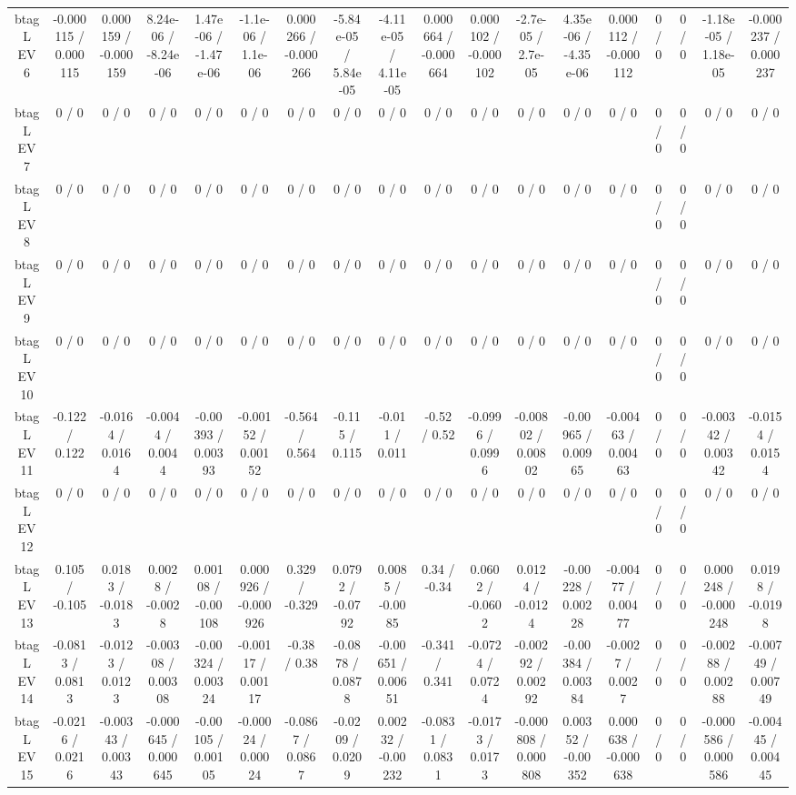 \documentclass[10pt]{article}
\begin{document}
\begin{table}[htbp]
\begin{center}
\begin{tabular}{|c|c|c|c|c|c|c|c|c|c|c|c|c|c|c|c|c|c|}
  btag L EV 6 & -0.000115 / 0.000115 & 0.000159 / -0.000159 & 8.24e-06 / -8.24e-06 & 1.47e-06 / -1.47e-06 & -1.1e-06 / 1.1e-06 & 0.000266 / -0.000266 & -5.84e-05 / 5.84e-05 & -4.11e-05 / 4.11e-05 & 0.000664 / -0.000664 & 0.000102 / -0.000102 & -2.7e-05 / 2.7e-05 & 4.35e-06 / -4.35e-06 & 0.000112 / -0.000112 & 0 / 0 & 0 / 0 & -1.18e-05 / 1.18e-05 & -0.000237 / 0.000237 \\ 
  btag L EV 7 & 0 / 0 & 0 / 0 & 0 / 0 & 0 / 0 & 0 / 0 & 0 / 0 & 0 / 0 & 0 / 0 & 0 / 0 & 0 / 0 & 0 / 0 & 0 / 0 & 0 / 0 & 0 / 0 & 0 / 0 & 0 / 0 & 0 / 0 \\ 
  btag L EV 8 & 0 / 0 & 0 / 0 & 0 / 0 & 0 / 0 & 0 / 0 & 0 / 0 & 0 / 0 & 0 / 0 & 0 / 0 & 0 / 0 & 0 / 0 & 0 / 0 & 0 / 0 & 0 / 0 & 0 / 0 & 0 / 0 & 0 / 0 \\ 
  btag L EV 9 & 0 / 0 & 0 / 0 & 0 / 0 & 0 / 0 & 0 / 0 & 0 / 0 & 0 / 0 & 0 / 0 & 0 / 0 & 0 / 0 & 0 / 0 & 0 / 0 & 0 / 0 & 0 / 0 & 0 / 0 & 0 / 0 & 0 / 0 \\ 
  btag L EV 10 & 0 / 0 & 0 / 0 & 0 / 0 & 0 / 0 & 0 / 0 & 0 / 0 & 0 / 0 & 0 / 0 & 0 / 0 & 0 / 0 & 0 / 0 & 0 / 0 & 0 / 0 & 0 / 0 & 0 / 0 & 0 / 0 & 0 / 0 \\ 
  btag L EV 11 & -0.122 / 0.122 & -0.0164 / 0.0164 & -0.0044 / 0.0044 & -0.00393 / 0.00393 & -0.00152 / 0.00152 & -0.564 / 0.564 & -0.115 / 0.115 & -0.011 / 0.011 & -0.52 / 0.52 & -0.0996 / 0.0996 & -0.00802 / 0.00802 & -0.00965 / 0.00965 & -0.00463 / 0.00463 & 0 / 0 & 0 / 0 & -0.00342 / 0.00342 & -0.0154 / 0.0154 \\ 
  btag L EV 12 & 0 / 0 & 0 / 0 & 0 / 0 & 0 / 0 & 0 / 0 & 0 / 0 & 0 / 0 & 0 / 0 & 0 / 0 & 0 / 0 & 0 / 0 & 0 / 0 & 0 / 0 & 0 / 0 & 0 / 0 & 0 / 0 & 0 / 0 \\ 
  btag L EV 13 & 0.105 / -0.105 & 0.0183 / -0.0183 & 0.0028 / -0.0028 & 0.00108 / -0.00108 & 0.000926 / -0.000926 & 0.329 / -0.329 & 0.0792 / -0.0792 & 0.0085 / -0.0085 & 0.34 / -0.34 & 0.0602 / -0.0602 & 0.0124 / -0.0124 & -0.00228 / 0.00228 & -0.00477 / 0.00477 & 0 / 0 & 0 / 0 & 0.000248 / -0.000248 & 0.0198 / -0.0198 \\ 
  btag L EV 14 & -0.0813 / 0.0813 & -0.0123 / 0.0123 & -0.00308 / 0.00308 & -0.00324 / 0.00324 & -0.00117 / 0.00117 & -0.38 / 0.38 & -0.0878 / 0.0878 & -0.00651 / 0.00651 & -0.341 / 0.341 & -0.0724 / 0.0724 & -0.00292 / 0.00292 & -0.00384 / 0.00384 & -0.0027 / 0.0027 & 0 / 0 & 0 / 0 & -0.00288 / 0.00288 & -0.00749 / 0.00749 \\ 
  btag L EV 15 & -0.0216 / 0.0216 & -0.00343 / 0.00343 & -0.000645 / 0.000645 & -0.00105 / 0.00105 & -0.00024 / 0.00024 & -0.0867 / 0.0867 & -0.0209 / 0.0209 & 0.00232 / -0.00232 & -0.0831 / 0.0831 & -0.0173 / 0.0173 & -0.000808 / 0.000808 & 0.00352 / -0.00352 & 0.000638 / -0.000638 & 0 / 0 & 0 / 0 & -0.000586 / 0.000586 & -0.00445 / 0.00445 \\ 

\end{tabular}
\end{center}
\end{table}
\end{document}
